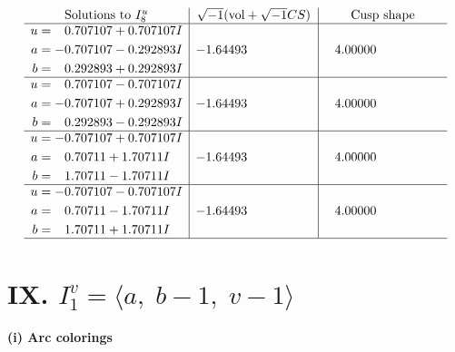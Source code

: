 \documentclass[1p]{elsarticle_modified}
\theoremstyle{definition}
\newcommand{\I}{\sqrt{-1}}
\begin{document}
$$\begin{array}{c|c|c}  
\text{Solutions to }I^u_{8}& \I (\text{vol} + \sqrt{-1}CS) & \text{Cusp shape}\\
 \hline 
\begin{aligned}
u &= \phantom{-}0.707107 + 0.707107 I \\
a &= -0.707107 - 0.292893 I \\
b &= \phantom{-}0.292893 + 0.292893 I\end{aligned}
 & -1.64493\phantom{ +0.000000I} & \phantom{-}4.00000\phantom{ +0.000000I} \\ \hline\begin{aligned}
u &= \phantom{-}0.707107 - 0.707107 I \\
a &= -0.707107 + 0.292893 I \\
b &= \phantom{-}0.292893 - 0.292893 I\end{aligned}
 & -1.64493\phantom{ +0.000000I} & \phantom{-}4.00000\phantom{ +0.000000I} \\ \hline\begin{aligned}
u &= -0.707107 + 0.707107 I \\
a &= \phantom{-}0.70711 + 1.70711 I \\
b &= \phantom{-}1.70711 - 1.70711 I\end{aligned}
 & -1.64493\phantom{ +0.000000I} & \phantom{-}4.00000\phantom{ +0.000000I} \\ \hline\begin{aligned}
u &= -0.707107 - 0.707107 I \\
a &= \phantom{-}0.70711 - 1.70711 I \\
b &= \phantom{-}1.70711 + 1.70711 I\end{aligned}
 & -1.64493\phantom{ +0.000000I} & \phantom{-}4.00000\phantom{ +0.000000I}\\
 \hline 
 \end{array}$$\newpage\newpage\renewcommand{\arraystretch}{1}
\centering \section*{IX. $I^v_{1}= \langle a,\;b-1,\;v-1 \rangle$}
\flushleft \textbf{(i) Arc colorings}\\
\end{document}

